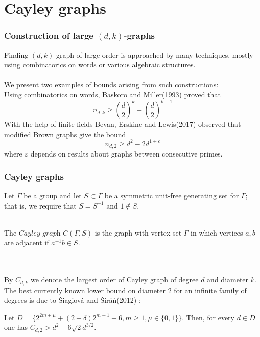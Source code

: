 \documentclass{beamer}
\begin{document}
\section{Cayley graphs} 
\begin{frame}
	\frametitle{Construction of large $(d,k)$-graphs}
	Finding $(d,k)$-graph of large order is approached by many techniques, mostly using combinatorics on words or various algebraic structures. \\~\\
    We present two examples of bounds arising from such constructions: ~\\
	Using combinatorics on words, Baskoro and Miller(1993) \cite{Bas-Mil} proved that 
    \begin{equation*}
        n_{d,k} \geq \left( \frac{d}{2} \right)^{k} +  \left( \frac{d}{2} \right)^{k-1}     
	\end{equation*}
	With the help of finite fields Bevan, Erskine and Lewis(2017) \cite{Bev-Ers} observed that modified Brown graphs give the bound
    \begin{equation*}
		n_{d,2} \geq d^{2} - 2d^{1+\varepsilon}     
	\end{equation*}
	where $\varepsilon$ depends on results about graphs between consecutive primes.	
\end{frame}
\begin{frame}
	\frametitle{Cayley graphs}
	Let $\Gamma$ be a group and let $S\subset \Gamma$ be a symmetric unit-free generating set for $\Gamma$; that is, we require that $S=S^{-1}$ and $1\notin S$.\\~\\
	\begin{definition}
		The $\textit{Cayley graph}$ $C(\Gamma,S)$ is the graph with vertex set $\Gamma$ in which vertices $a,b$ are adjacent if $a^{-1}b\in S$.	
	\end{definition} ~\\~\\
	By $C_{d,k}$ we denote the largest order of Cayley graph of degree $d$ and diameter $k$.
	The best currently known lower bound on diameter $2$ for an infinite family of degrees is due to \v{S}iagiov\'a and \v{S}ir\'a\v{n}(2012) \cite{Sia-Sir}: 
	\begin{theorem}
	Let $D = \{ 2^{2m+\mu}+    (2+\delta)2^{m+1}-6,m \geq 1, \mu \in \{0,1\} \}$. Then, for every $d\in D$ one has $C_{d,2} > d^{2} - 6\sqrt{2}d^{3/2}$.
	\end{theorem}
\end{frame}
\end{document}
